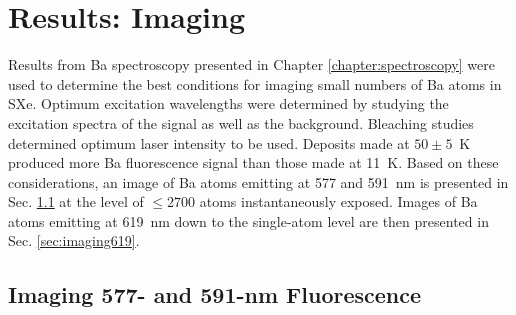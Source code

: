 \chapter{Results: Imaging}
\label{chapter:imaging}


Results from Ba spectroscopy presented in Chapter \ref{chapter:spectroscopy} were used to determine the best conditions for imaging small numbers of Ba atoms in SXe.  Optimum excitation wavelengths were determined by studying the excitation spectra of the signal as well as the background.  Bleaching studies determined optimum laser intensity to be used.  Deposits made at $50 \pm 5$~K produced more Ba fluorescence signal than those made at 11~K.  Based on these considerations, an image of Ba atoms emitting at 577 and 591~nm is presented in Sec. \ref{sec:imaging590and577} at the level of $\leq 2700$ atoms instantaneously exposed. Images of Ba atoms emitting at 619~nm down to the single-atom level are then presented in Sec. \ref{sec:imaging619}.






\section{Imaging 577- and 591-nm Fluorescence}
\label{sec:imaging590and577}

